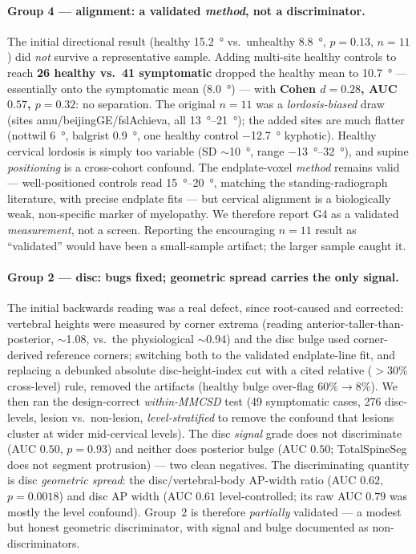 \paragraph{Group 4 --- alignment: a validated \emph{method}, not a discriminator.}
The initial directional result (healthy \SI{+15.2}{\degree} vs.\ unhealthy \SI{+8.8}{\degree}, $p=0.13$,
$n{=}11$) did \emph{not} survive a representative sample. Adding multi-site healthy controls to reach
\textbf{26 healthy vs.\ 41 symptomatic} dropped the healthy mean to \SI{+10.7}{\degree} --- essentially
onto the symptomatic mean (\SI{+8.0}{\degree}) --- with \textbf{Cohen $d=0.28$, AUC $0.57$, $p=0.32$}: no
separation. The original $n{=}11$ was a \emph{lordosis-biased} draw (sites amu/beijingGE/fslAchieva, all
\SIrange{+13}{+21}{\degree}); the added sites are much flatter (nottwil \SI{+6}{\degree}, balgrist
\SI{+0.9}{\degree}, one healthy control \SI{-12.7}{\degree} kyphotic). Healthy cervical lordosis is simply
too variable (SD \(\sim\)\SI{10}{\degree}, range \SIrange{-13}{+32}{\degree}), and supine \emph{positioning}
is a cross-cohort confound. The endplate-voxel \emph{method} remains valid --- well-positioned controls
read \SIrange{+15}{+20}{\degree}, matching the standing-radiograph literature, with precise endplate fits
--- but cervical alignment is a biologically weak, non-specific marker of myelopathy. We therefore report
G4 as a validated \emph{measurement}, not a screen. Reporting the encouraging $n{=}11$ result as
``validated'' would have been a small-sample artifact; the larger sample caught it.

\paragraph{Group 2 --- disc: bugs fixed; geometric spread carries the only signal.}
The initial backwards reading was a real defect, since root-caused and corrected: vertebral heights were
measured by corner extrema (reading \hahp{} anterior-taller-than-posterior, \(\sim\)1.08, vs.\ the
physiological \(\sim\)0.94) and the disc bulge used corner-derived reference corners; switching both to the
validated endplate-line fit, and replacing a debunked absolute disc-height-index cut with a cited relative
($>$30\% cross-level) rule, removed the artifacts (healthy bulge over-flag $60\%\!\to\!8\%$). We then ran
the design-correct \emph{within-MMCSD} test (49 symptomatic cases, 276 disc-levels, lesion vs.\ non-lesion,
\emph{level-stratified} to remove the confound that lesions cluster at wider mid-cervical levels). The
disc \emph{signal} grade does not discriminate (AUC $0.50$, $p=0.93$) and neither does posterior bulge
(AUC $0.50$; TotalSpineSeg does not segment protrusion) --- two clean negatives. The discriminating
quantity is disc \emph{geometric spread}: the disc/vertebral-body AP-width ratio (AUC $0.62$, $p=0.0018$)
and disc AP width (AUC $0.61$ level-controlled; its raw AUC $0.79$ was mostly the level confound). Group~2
is therefore \emph{partially} validated --- a modest but honest geometric discriminator, with signal and
bulge documented as non-discriminators.

